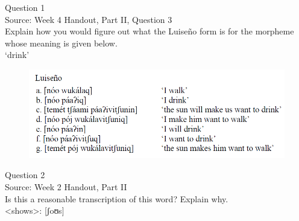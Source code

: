 \documentclass[12pt]{article}
\begin{document}
\begin{center}
\textbf{{\color{violet}{\HUGE 20201006 Tuesday\\}}}

\textbf{{\color{violet}{\HUGE ALL EXAMS\\}}}

\end{center}
\newpage

\begin{center}
\textbf{{\color{blue}{\HUGE START OF EXAM\\}}}

\textbf{{\color{blue}{\HUGE Student ID: 15082\\}}}

\textbf{{\color{blue}{\HUGE 9:00\\}}}

\end{center}
\newpage

{\large Question 1}\\

Source: Week 4 Handout, Part II, Question 3\\

Explain how you would figure out what the Luiseño form is for the morpheme whose meaning is given below.\\

‘drink’

\begin{figure}[H]
\includegraphics{../images/luiseno.png}
\end{figure}

\newpage

{\large Question 2}\\

Source: Week 2 Handout, Part II\\

Is this a reasonable transcription of this word? Explain why.\\

<shows>: {[ʃoʊs]}


\newpage
\end{document}

